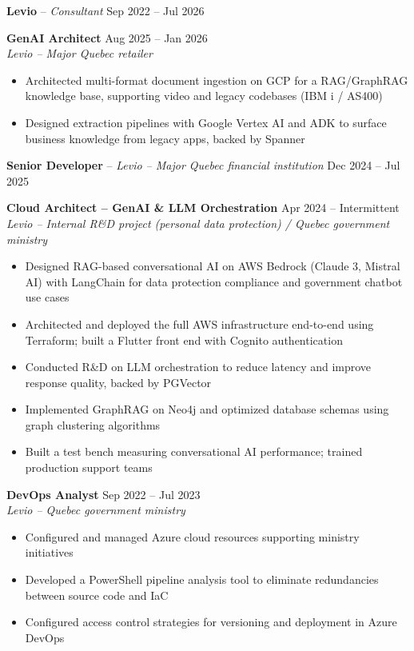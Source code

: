 ﻿\documentclass[10pt,letterpaper]{article}
\begin{document}
\vspace{2pt}
\textbf{Levio} -- \textit{Consultant} \hfill Sep 2022 -- Jul 2026

\vspace{2pt}
\textbf{GenAI Architect} \hfill Aug 2025 -- Jan 2026\\
\textit{Levio -- Major Quebec retailer}
\begin{itemize}[nosep]
\item Architected multi-format document ingestion on GCP for a RAG/GraphRAG knowledge base, supporting video and legacy codebases (IBM i / AS400)
\item Designed extraction pipelines with Google Vertex AI and ADK to surface business knowledge from legacy apps, backed by Spanner
\end{itemize}

\vspace{2pt}
\textbf{Senior Developer} -- \textit{Levio -- Major Quebec financial institution} \hfill Dec 2024 -- Jul 2025

\vspace{2pt}
\textbf{Cloud Architect -- GenAI \& LLM Orchestration} \hfill Apr 2024 -- Intermittent\\
\textit{Levio -- Internal R\&D project (personal data protection) / Quebec government ministry}
\begin{itemize}[nosep]
\item Designed RAG-based conversational AI on AWS Bedrock (Claude 3, Mistral AI) with LangChain for data protection compliance and government chatbot use cases
\item Architected and deployed the full AWS infrastructure end-to-end using Terraform; built a Flutter front end with Cognito authentication
\item Conducted R\&D on LLM orchestration to reduce latency and improve response quality, backed by PGVector
\item Implemented GraphRAG on Neo4j and optimized database schemas using graph clustering algorithms
\item Built a test bench measuring conversational AI performance; trained production support teams
\end{itemize}

\vspace{2pt}
\textbf{DevOps Analyst} \hfill Sep 2022 -- Jul 2023\\
\textit{Levio -- Quebec government ministry}
\begin{itemize}[nosep]
\item Configured and managed Azure cloud resources supporting ministry initiatives
\item Developed a PowerShell pipeline analysis tool to eliminate redundancies between source code and IaC
\item Configured access control strategies for versioning and deployment in Azure DevOps
\end{itemize}
\end{document}
